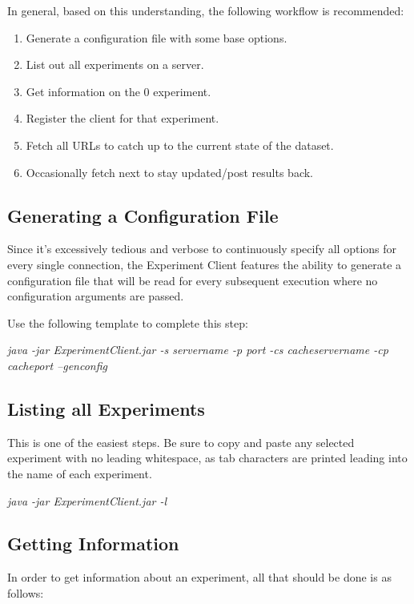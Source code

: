 \documentclass[letterpaper]{article}
\begin{document}
In general, based on this understanding, the following workflow is recommended:

\begin{enumerate}
   \item Generate a configuration file with some base options.
   \item List out all experiments on a server.
   \item Get information on the 0 experiment.
   \item Register the client for that experiment.
   \item Fetch all URLs to catch up to the current state of the dataset.
   \item Occasionally fetch next to stay updated/post results back.
\end{enumerate}

\subsection{Generating a Configuration File}
Since it's excessively tedious and verbose to continuously specify all options for every single connection, the Experiment Client features the ability to generate a configuration file that will be read for every subsequent execution where no configuration arguments are passed. 

Use the following template to complete this step:

\begin{addmargin}[1em]{2em}
\textit{java -jar ExperimentClient.jar -s servername -p port -cs cacheservername -cp cacheport --genconfig}
\end{addmargin}

\subsection{Listing all Experiments}
This is one of the easiest steps. Be sure to copy and paste any selected experiment with no leading whitespace, as tab characters are printed leading into the name of each experiment.

\begin{addmargin}[1em]{2em}
\textit{java -jar ExperimentClient.jar -l}
\end{addmargin}

\subsection{Getting Information}
In order to get information about an experiment, all that should be done is as follows:
\end{document}
